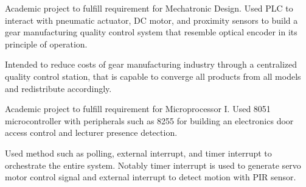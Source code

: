 \documentclass[letterpaper]{deedy-resume} %
\begin{document}
\begin{minipage}[t]{0.66\textwidth}
\vspace{\topsep}
\begin{tightitemize}
\item Academic project to fulfill requirement for Mechatronic Design.
Used PLC to interact with pneumatic actuator, DC motor, and proximity sensors to build a gear manufacturing quality control system that resemble optical encoder in its principle of operation.
\item Intended to reduce costs of gear manufacturing industry through a centralized quality control station, that is capable to converge all products from all models and redistribute accordingly.
\end{tightitemize}
\sectionspace %

\vspace{\topsep}
\begin{tightitemize}
\item Academic project to fulfill requirement for Microprocessor I.
Used 8051 microcontroller with peripherals such as 8255 for building an electronics door access control and lecturer presence detection.
\item Used method such as polling, external interrupt, and timer interrupt to orchestrate the entire system.
Notably timer interrupt is used to generate servo motor control signal and external interrupt to detect motion with PIR sensor.
\end{tightitemize}
\sectionspace %

\end{minipage}
\end{document}
